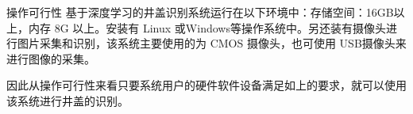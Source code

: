 \documentclass{beamer}
\begin{document}
\begin{frame}{操作可行性}
基于深度学习的井盖识别系统运行在以下环境中：存储空间：16GB以上，内存 8G 以上。安装有 Linux 或Windows等操作系统中。另还装有摄像头进行图片采集和识别，该系统主要使用的为 CMOS 摄像头，也可使用 USB摄像头来进行图像的采集。
\newline

因此从操作可行性来看只要系统用户的硬件软件设备满足如上的要求，就可以使用该系统进行井盖的识别。
\end{frame}
\end{document}
